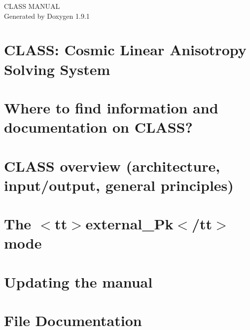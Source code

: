 \let\mypdfximage\pdfximage\def\pdfximage{\immediate\mypdfximage}\documentclass[twoside]{book}
\newcommand{\+}{\discretionary{\mbox{\scriptsize$\hookleftarrow$}}{}{}}
\newcommand{\clearemptydoublepage}{%
  \newpage{\pagestyle{empty}\cleardoublepage}%
}
\begin{document}
\raggedbottom

\hypersetup{pageanchor=false,
             bookmarksnumbered=true,
             pdfencoding=unicode
            }
\begin{titlepage}
\vspace*{7cm}
\begin{center}%
{\Large CLASS MANUAL }\\
\vspace*{1cm}
{\large Generated by Doxygen 1.9.1}\\
\end{center}
\end{titlepage}
\clearemptydoublepage
{}
\tableofcontents
\clearemptydoublepage
{}
\hypersetup{pageanchor=true}

\chapter{CLASS\+: Cosmic Linear Anisotropy Solving System}
\label{index}\hypertarget{index}{}
\chapter{Where to find information and documentation on CLASS?}
\label{md_chap2}

\chapter{CLASS overview (architecture, input/output, general principles)}
\label{md_chap3}

\chapter{The $<$tt$>$external\+\_\+\+Pk$<$/tt$>$ mode}
\label{md__Users_hiromac7_Downloads_komatsuBiref_birefclass_v1_external_Pk_README}

\chapter{Updating the manual}
\label{md_mod}

\chapter{File Documentation}























\backmatter
\newpage
{}
\clearemptydoublepage
{}
\printindex
\end{document}
